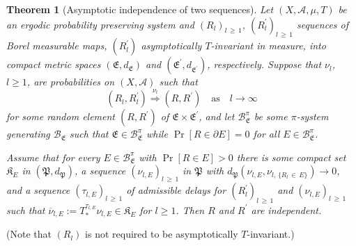 \documentclass[10pt]{amsart}
\newtheorem{theo}{Theorem}[section]
\theoremstyle{definition}\newtheorem{defi}[theo]{Definition}\newtheorem{rema}[theo]{Remark}\newtheorem{exam}[theo]{Example}\newtheorem{exem}[theo]{Example}\newtheorem{nota}[theo]{Notation}
\newcommand{\clA}{\mathcal{A}}
\newcommand{\clB}{\mathcal{B}}
\newcommand{\frkK}{\mathfrak{K}}
\newcommand{\frkP}{\mathfrak{P}}
\newcommand{\frkE}{\mathfrak{E}}
\begin{document}
\begin{theo}[{Asymptotic independence of two sequences}]\label{T_AsyIndepForAsyInvarSequences}
Let $(X,\clA,\mu,T)$ be an ergodic probability preserving system and $(R_{l})_{l\,\geq\,1}$, $(R_{l}^{\prime })_{l\,\geq\,1}$ sequences of Borel measurable maps, $(R_{l}^{\prime})$ asymptotically $T$-invariant in measure, into compact metric spaces $(\frkE,d_{\frkE})$ and $(\frkE^{\prime},d_{\frkE ^{\prime}})$, respectively. Suppose that $\nu_{l}$, $l\geq1$, are probabilities on $(X,\clA)$ such that
\begin{equation}
\left(R_{l},R_{l}^{\prime}\right)\overset{\nu_{l}}{\Longrightarrow}\left(R,R^{\prime}\right)\quad\text{as}\quad l\rightarrow\infty
\end{equation}
for some random element $(R,R^{\prime})$ of $\frkE\times\frkE^{\prime}$, and let $\clB_{\frkE}^{\pi}$ be some $\pi$-system generating $\clB_{\frkE}$ such that $\frkE\in
\clB_{\frkE}^{\pi}$ while $\Pr[R\in\partial E]=0$ for all $E\in\clB_{\frkE}^{\pi}$.

Assume that for every $E\in\clB_{\frkE}^{\pi}$ with $\Pr[R\in E]>0$ there is some compact set $\frkK_{E}$ in $(\frkP,d_{\frkP})$, a sequence $(\nu_{l,E})_{l\,\geq\,1}$ in $\frkP$ with $d_{\frkP}(\nu_{l,E},\nu_{l,\,\{R_{l}\,\in\,E\}})\rightarrow0$, and a sequence $(\tau_{l,E})_{l\,\geq\,1}$ of admissible delays for $(R_{l}^{\prime })_{l\,\geq\,1}$ and $(\nu_{l,E})_{l\,\geq\,1}$ such that $\overline{\nu} _{l,E}:=T_{\ast}^{\tau_{l,E}}\nu_{l,E}\in\frkK_{E}$ for $l\geq1$. Then $R$ and $R^{\prime}$ are independent.
\end{theo}

(Note that $(R_{l})$ is not required to be asymptotically $T$-invariant.)
\end{document}
